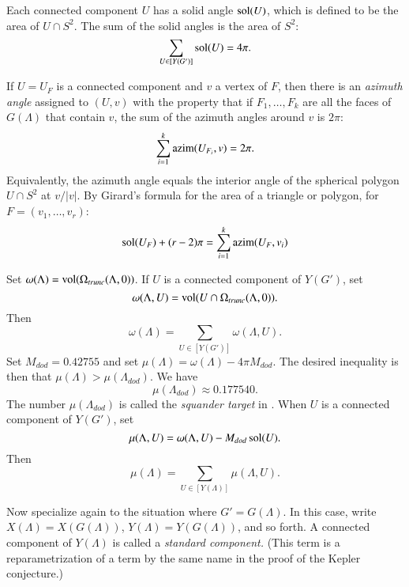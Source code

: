 \begin{floatingfigure}{80mm}
  \begin{center}
   \end{center}
  \caption{}
\label{fig:counter}
\end{floatingfigure}


Each connected component $U$ has a solid angle $\operatorname{sol}(U)$, which
is defined to be the area of $U\cap S^2$.  The sum of the
solid angles is the area of $S^2$:
 $$
 \sum_{U\in[Y(G')]} \operatorname{sol}(U) = 4\pi.
 $$

If $U=U_F$ is a connected component and $v$ a vertex of $F$, then there
is an {\it azimuth angle} assigned to $(U,v)$ with the property
that if $F_1,\ldots,F_k$ are all the faces of $G(\Lambda)$
that contain $v$, the sum of the azimuth angles around
$v$ is $2\pi$:
  $$
  \sum_{i=1}^k {\operatorname{azim}}(U_{F_i},v) = 2\pi.
  $$
Equivalently, 
the azimuth angle equals the interior angle of the spherical
polygon $U\cap S^2$ at $v/|v|$.  By Girard's formula for
the area of a triangle or polygon,  for
$F = (v_1,\ldots,v_r)$:
  $$
  \operatorname{sol}(U_F) + (r-2)\pi = \sum_{i=1}^k {\operatorname{azim}}(U_F,v_i)
  $$

Set $\omega(\Lambda)={\operatorname{vol}}(\Omega_{trunc}(\Lambda,0))$.
If $U$ is a connected component of $Y(G')$, set
  $$\omega(\Lambda,U) = {\operatorname{vol}}(U\cap \Omega_{trunc}(\Lambda,0)).$$
Then
  \begin{equation}\label{eqn:omegaU}
  \omega(\Lambda) = 
  \sum_{U\in[Y(G')]} \omega(\Lambda,U).
  \end{equation}
Set $M_{dod}=0.42755$ and set  $\mu(\Lambda)= \omega(\Lambda)- 4\pi M_{dod}$.
The desired inequality is then
that $\mu(\Lambda) > \mu(\Lambda_{dod})$.  
We have 
$$
  \mu(\Lambda_{dod}) \approx 0.177540.
$$
The number $\mu(\Lambda_{dod})$ is called the {\it squander target} in \cite{arx}.  
When $U$ is a connected component of $Y(G')$, set
 \begin{equation}\label{eqn:mU}
  \mu(\Lambda,U)= \omega(\Lambda,U) - M_{dod} \operatorname{sol}(U).
  \end{equation}
Then
$$
\mu(\Lambda) = \sum_{U\in[Y(\Lambda)]} \mu(\Lambda,U).
$$




Now specialize again to the situation where $G'=G(\Lambda)$.
In this case, write $X(\Lambda)=X(G(\Lambda))$, $Y(\Lambda)=Y(G(\Lambda))$,
and so forth.
A connected component of $Y(\Lambda)$
is called a {\it standard component.}  (This term is a
reparametrization of a term by the same name
in the proof of the Kepler conjecture.)


